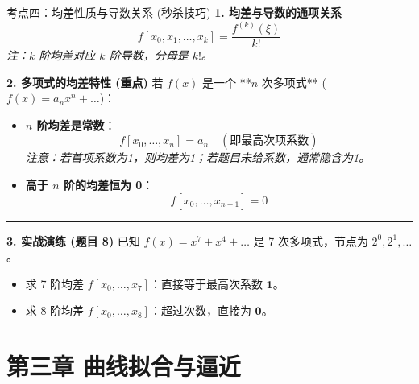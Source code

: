 \documentclass[12pt, a4paper]{article}
\begin{document}
\begin{knowpoint}{考点四：均差性质与导数关系 (秒杀技巧)}
    \textbf{1. 均差与导数的通项关系}
    \[ f[x_0, x_1, \dots, x_k] = \frac{f^{(k)}(\xi)}{k!} \]
    \textit{注：$k$ 阶均差对应 $k$ 阶导数，分母是 $k!$。}

    \textbf{2. 多项式的均差特性 (重点)}
    若 $f(x)$ 是一个 **$n$ 次多项式** ($f(x) = a_n x^n + \dots$)：
    \begin{itemize}
        \item \textbf{$n$ 阶均差是常数}：
        \[ f[x_0, \dots, x_n] = a_n \quad (\text{即最高次项系数}) \]
        \textit{注意：若首项系数为1，则均差为1；若题目未给系数，通常隐含为1。}
        
        \item \textbf{高于 $n$ 阶的均差恒为 0}：
        \[ f[x_0, \dots, x_{n+1}] = 0 \]
    \end{itemize}

    \vspace{0.5em}
    \hrule
    \vspace{0.5em}

    \textbf{3. 实战演练 (题目 8)}
    已知 $f(x) = x^7 + x^4 + \dots$ 是 7 次多项式，节点为 $2^0, 2^1, \dots$。
    \begin{itemize}
        \item 求 7 阶均差 $f[x_0, \dots, x_7]$：直接等于最高次系数 $\mathbf{1}$。
        \item 求 8 阶均差 $f[x_0, \dots, x_8]$：超过次数，直接为 $\mathbf{0}$。
    \end{itemize}
\end{knowpoint}


\section*{第三章 曲线拟合与逼近}
\end{document}
